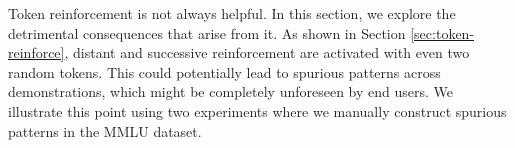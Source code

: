 \documentclass{article} %
\def\elliott#1{{\color{cyan}{\bf [Elliott:} {{#1}}{\bf ]}}}
\begin{document}




Token reinforcement is not always helpful. 
In this section, we explore the detrimental consequences that arise from it. 
As shown in Section \ref{sec:token-reinforce}, distant and successive reinforcement are activated with even two random tokens.
This could potentially lead to spurious patterns across demonstrations, which might be completely unforeseen by end users.
We illustrate this point using two experiments where we manually construct spurious patterns in the MMLU dataset.
\end{document}
